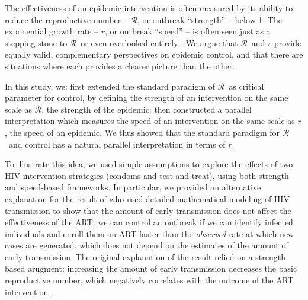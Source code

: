 \documentclass[12pt]{article}
\newcommand{\RR}{\ensuremath{{\mathcal R}}}
\begin{document}
The effectiveness of an epidemic intervention is often measured by its ability to reduce the reproductive number -- \RR, or outbreak ``strength'' -- below 1. The exponential growth rate -- $r$, or outbreak ``speed'' -- is often seen just as a stepping stone to \RR\, or even overlooked entirely \citep{park2020reconciling}.
We argue that \RR\ and $r$ provide equally valid, complementary perspectives on epidemic control, and that there are situations where each provides a clearer picture than the other.

In this study, we:
first extended the standard paradigm of \RR\ as critical parameter for control, by defining the strength of an intervention on the same scale as \RR, the strength of the epidemic; 
then constructed a parallel interpretation which measures the speed of an intervention on the same scale as $r$, the speed of an epidemic.
We thus showed that the standard paradigm for \RR\ and control has a natural parallel interpretation in terms of $r$.

To illustrate this idea, we used simple assumptions to explore the effects of two HIV intervention strategies (condoms and test-and-treat), using both strength- and speed-based frameworks.
In particular, we provided an alternative explanation for the result of \cite{eaton2014proportion} who used detailed mathematical modeling of HIV transmission to show that the amount of early transmission does not affect the effectiveness of the ART:
we can control an outbreak if we can identify infected individuals and enroll them on ART faster than the \emph{observed} rate at which new cases are generated, which does not depend on the estimates of the amount of early transmission.
The original explanation of the result relied on a strength-based arugment: increasing the amount of early transmission decreases the basic reproductive number, which negatively correlates with the outcome of the ART intervention \citep{eaton2014proportion}.
\end{document}
